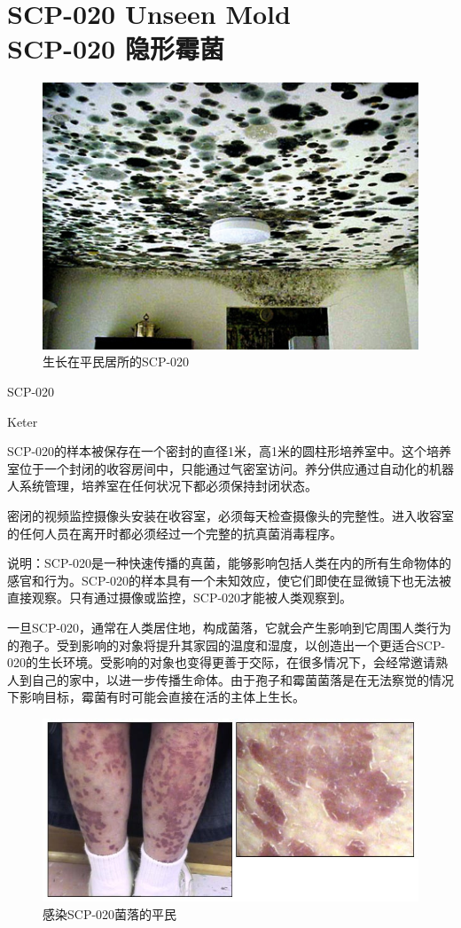 \chapter[SCP-020 隐形霉菌]{
    SCP-020 Unseen Mold\\
    SCP-020 隐形霉菌
}

\label{chap:SCP-020}

\begin{figure}[H]
    \centering
    \includegraphics[width=0.5\linewidth]{images/SCP-020.jpg}
    \caption*{生长在平民居所的SCP-020}
\end{figure}

 SCP-020

 Keter

 SCP-020的样本被保存在一个密封的直径1米，高1米的圆柱形培养室中。这个培养室位于一个封闭的收容房间中，只能通过气密室访问。养分供应通过自动化的机器人系统管理，培养室在任何状况下都必须保持封闭状态。

密闭的视频监控摄像头安装在收容室，必须每天检查摄像头的完整性。进入收容室的任何人员在离开时都必须经过一个完整的抗真菌消毒程序。

 说明：SCP-020是一种快速传播的真菌，能够影响包括人类在内的所有生命物体的感官和行为。SCP-020的样本具有一个未知效应，使它们即使在显微镜下也无法被直接观察。只有通过摄像或监控，SCP-020才能被人类观察到。

一旦SCP-020，通常在人类居住地，构成菌落，它就会产生影响到它周围人类行为的孢子。受到影响的对象将提升其家园的温度和湿度，以创造出一个更适合SCP-020的生长环境。受影响的对象也变得更善于交际，在很多情况下，会经常邀请熟人到自己的家中，以进一步传播生命体。由于孢子和霉菌菌落是在无法察觉的情况下影响目标，霉菌有时可能会直接在活的主体上生长。

\begin{figure}[H]
    \centering
    \includegraphics[width=0.5\linewidth]{images/SCP-020-2.jpg}
    \caption*{感染SCP-020菌落的平民}
\end{figure}

